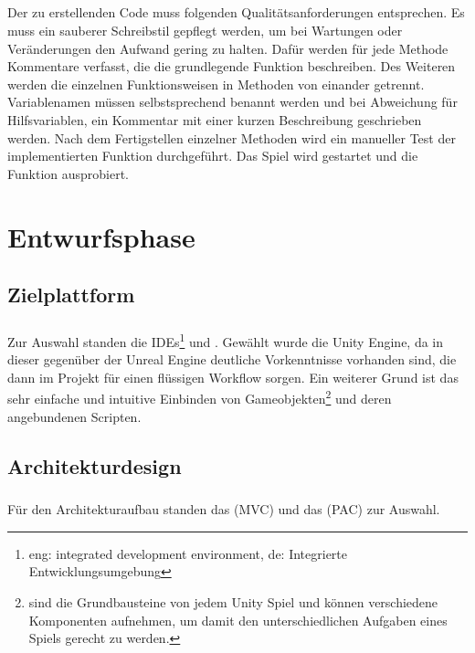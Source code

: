 \paragraph{}
Der zu erstellenden Code muss folgenden Qualitätsanforderungen entsprechen. Es muss ein sauberer Schreibstil gepflegt werden, um bei Wartungen oder Veränderungen den Aufwand gering zu halten. Dafür werden für jede Methode Kommentare verfasst, die die grundlegende Funktion beschreiben. Des Weiteren werden die einzelnen Funktionsweisen in Methoden von einander getrennt. Variablenamen müssen selbstsprechend benannt werden und bei Abweichung für Hilfsvariablen, ein Kommentar mit einer kurzen Beschreibung geschrieben werden.
Nach dem Fertigstellen einzelner Methoden wird ein manueller Test der implementierten Funktion durchgeführt. Das Spiel wird gestartet und die Funktion ausprobiert.

\chapter{Entwurfsphase}
\section{Zielplattform}
\paragraph{}
Zur Auswahl standen die IDEs\footnote{eng: integrated development environment, de: Integrierte Entwicklungsumgebung}  und . Gewählt wurde die Unity Engine, da in dieser gegenüber der Unreal Engine deutliche Vorkenntnisse vorhanden sind, die dann im Projekt für einen flüssigen Workflow sorgen. Ein weiterer Grund ist das sehr einfache und intuitive Einbinden von Gameobjekten\footnote{ sind die Grundbausteine von jedem Unity Spiel und können verschiedene Komponenten aufnehmen, um damit den unterschiedlichen Aufgaben eines Spiels gerecht zu werden.} und deren angebundenen Scripten.

\section{Architekturdesign}
\paragraph{}
Für den Architekturaufbau standen das  (MVC) und das  (PAC) zur Auswahl.

